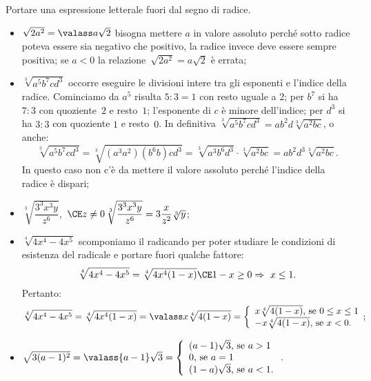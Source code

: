 \begin{exrig}
 \begin{esempio}
 Portare una espressione letterale fuori dal segno di radice.
\begin{itemize}
 \item $\sqrt{2a^2}=\valass a\sqrt 2$ bisogna mettere $a$ in valore assoluto perché sotto radice poteva essere sia negativo che positivo, la radice invece deve essere sempre positiva; se $a<0$ la relazione~$\sqrt{2a^2}=a\sqrt 2$ è errata;
 \item $\sqrt[3]{a^5b^7cd^3}$ occorre eseguire le divisioni intere tra gli esponenti e l'indice della radice. Cominciamo da $a^5$ risulta $5:3 = 1$ con resto uguale a $2$; per $b^7$ si ha $7:3$ con quoziente~$2$ e resto~$1$; l'esponente di $c$ è minore dell'indice; per $d^3$ si ha $3:3$ con quoziente $1$ e resto~$0$. In definitiva $\sqrt[3]{a^5b^7cd^3}={ab}^2 d\sqrt[3]{a^2{bc}}$, o anche:
\[\sqrt[3]{a^5b^7cd^3}=\sqrt[3]{(a^3a^2)(b^6b)cd^3}=\sqrt[3]{a^3b^6d^3}\cdot \sqrt[3]{a^2bc}=ab^2d^3\sqrt[3]{a^2bc}.\]
In questo caso non c'è da mettere il valore assoluto perché l'indice della radice è dispari;
 \item $\sqrt[3]{\dfrac{3^3x^3y}{z^6}}$,\, $\CE z\neq 0\,\sqrt[3]{\dfrac{3^3x^3y}{z^6}}=3\dfrac x{z^2}\sqrt[3]y$;
 \item$\sqrt[4]{4x^4-4x^5}$ scomponiamo il radicando per poter studiare le condizioni di esistenza del radicale e portare fuori qualche fattore: 
 \[\sqrt[4]{4x^4-4x^5}=\sqrt[4]{4x^4(1-x)} \CE 1-x\ge 0\Rightarrow \ x\le 1.\]
 Pertanto:
 \[\sqrt[4]{4x^4-4x^5}=\sqrt[4]{4x^4(1-x)}=\valass x\sqrt[4]{4(1-x)}=\left\{\begin{array}{l}
 x\sqrt[4]{4(1-x)}\text{, se }0\le x\le 1\\
 -x\sqrt[4]{4(1-x)}\text{, se }x<0.\end{array};\right.\]
 \item $\sqrt{3(a-1)^2}=\valass{a-1}\sqrt 3=\left\{\begin{array}{l}
 (a-1)\sqrt 3\text{, se }a>1\\
 0\text{, se }a=1\\
 (1-a)\sqrt 3\text{, se }a<1.\end{array}\right.$.
\end{itemize}
 \end{esempio}
\end{exrig}
\vspazio\ovalbox{\risolvii \ref{ese:2.42}, \ref{ese:2.43}, \ref{ese:2.44}, \ref{ese:2.45}}

